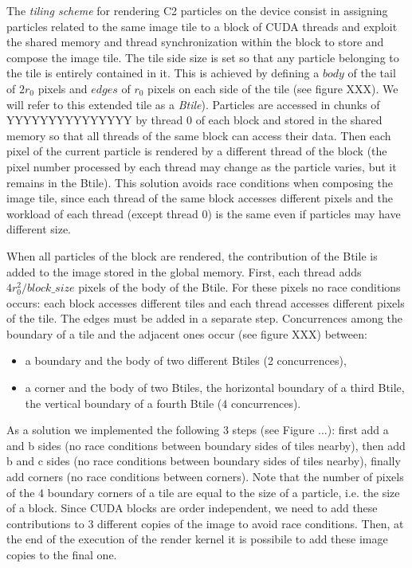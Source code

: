 \documentclass[11pt]{article}
\begin{document}
The \textit{tiling scheme} for rendering C2 particles on the device consist in 
assigning particles related to the same image tile to a block of CUDA threads 
and exploit the shared memory and thread synchronization within the block to store 
and compose the image tile. The tile side size is set so that any particle 
belonging to the tile is entirely contained in it. This is achieved by 
defining a $body$ of the tail of $2r_0$ pixels and $edges$ of $r_0$ pixels on each side 
of the tile (see figure XXX). 
We will refer to this extended tile as a \textit{Btile}).
Particles are accessed in chunks of YYYYYYYYYYYYYYY  by thread 0 of each block and stored 
in the shared memory so that all threads of the same block can access their data. 
Then each pixel of the current particle is rendered by a different thread of 
the block (the pixel number processed by each thread may change as the 
particle varies, but it remains in the Btile). 
This solution avoids race conditions when composing the image tile, since each 
thread of the same block accesses different pixels and the workload of each thread 
(except thread 0) is the same even if particles may have different size.

When all particles of the block are rendered, the contribution of the Btile 
is added to the image stored in the global memory. First, each thread adds
$4r_0^2/block\_size$ pixels of the body of the Btile. For these pixels no race 
conditions occurs: each block accesses different tiles and each thread accesses 
different pixels of the tile. The edges must be added in a separate step. 
Concurrences among the boundary of a tile and the adjacent ones occur (see
figure XXX) between:
\begin{itemize}
\item
a boundary and the body of two different Btiles (2 concurrences), 
\item
a corner and the body of two Btiles, the horizontal boundary 
of a third Btile, the vertical boundary of a fourth Btile (4 concurrences). 
\end{itemize}
As a solution we implemented the following 3 steps (see Figure ...):  
first add a and b sides (no race conditions between boundary sides of tiles nearby),
then add b and c sides (no race conditions between boundary sides of tiles nearby),
finally add corners (no race conditions between corners). 
Note that the number of pixels of the 4 boundary corners of a tile are equal to 
the size of a particle, i.e. the size of a block. Since CUDA blocks are order 
independent, we need to add these contributions to 3 different copies of the image 
to avoid race conditions. Then, at the end of the execution of the render kernel 
it is possibile to add these image copies to the final one.
\end{document}
